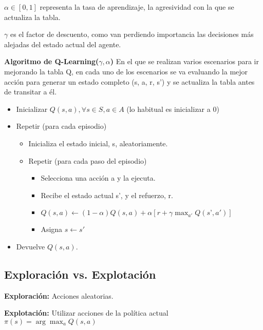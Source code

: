 \documentclass[12pt, twoside, openright]{report} %
\begin{document}
$\alpha \in [0,1]$ representa la tasa de aprendizaje, la agresividad con la que se actualiza la tabla.

$\gamma$ es el factor de descuento, como van perdiendo importancia las decisiones más alejadas del estado actual del agente.

\textbf{Algoritmo de Q-Learning($\gamma, \alpha$)}
En el que se realizan varios escenarios para ir mejorando la tabla Q, en cada uno de los escenarios se va evaluando la mejor acción para generar un estado completo (s, a, r, s') y se actualiza la tabla antes de transitar a él.
\begin{itemize}
	\item Inicializar $Q(s, a), \forall s \in S, a \in A$ (lo habitual es inicializar a 0)
	\item Repetir (para cada episodio)
	      \begin{itemize}
		      \item Inicializa el estado inicial, s, aleatoriamente.
		      \item Repetir (para cada paso del episodio)
		            \begin{itemize}
			            \item Selecciona una acción a y la ejecuta.
			            \item Recibe el estado actual s’, y el refuerzo, r.
			            \item $Q(s, a) \leftarrow (1-\alpha) Q(s, a) + \alpha[r + \gamma \max_{a'} Q(s’, a')]$
			            \item Asigna $s \leftarrow s'$
		            \end{itemize}
	      \end{itemize}
	\item Devuelve $Q(s, a)$.
\end{itemize}

\subsection{Exploración vs. Explotación}

\textbf{Exploración:} Acciones aleatorias.

\textbf{Explotación:} Utilizar acciones de la política actual $\pi (s)=\arg \max _a Q (s, a)$
\end{document}
